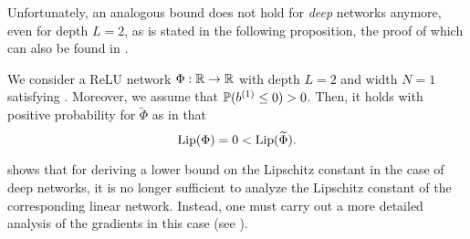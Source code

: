 Unfortunately, an analogous bound does not hold for \emph{deep} networks anymore, even for depth $L =2$, as is stated in the following proposition, the proof of which can also be found in .
\begin{proposition}\label{prop:not_working_deep}
We consider a ReLU network $\Phi: \mathbb{R} \to \mathbb{R}$ with depth $L=2$ and width $N=1$ satisfying . Moreover, we assume that $\mathbb{P}(b^{(1)} \leq 0)> 0$. Then, it holds with positive probability for $\widetilde{\Phi}$ as in  that 
\begin{equation*}
\operatorname{Lip}(\Phi) = 0 < \operatorname{Lip}(\widetilde{\Phi}).
\end{equation*}
\end{proposition}
 shows that for deriving a lower bound on the Lipschitz constant in the case of deep networks,
it is no longer sufficient to analyze the Lipschitz constant of the corresponding linear network. Instead, one must carry out a more detailed analysis of the gradients in this case (see ).


